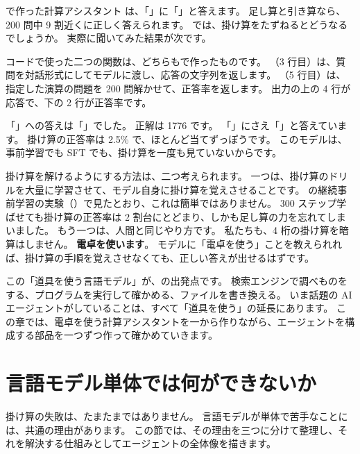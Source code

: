 で作った計算アシスタント  は、「」に「」と答えます。
足し算と引き算なら、200 問中 9 割近くに正しく答えられます。
では、掛け算をたずねるとどうなるでしょうか。
実際に聞いてみた結果が次です。



コードで使った二つの関数は、どちらもで作ったものです。
（3 行目）は、質問を対話形式にしてモデルに渡し、応答の文字列を返します。
（5 行目）は、指定した演算の問題を 200 問解かせて、正答率を返します。
出力の上の 4 行が応答で、下の 2 行が正答率です。

「」への答えは「」でした。
正解は 1776 です。
「」にさえ「」と答えています。
掛け算の正答率は 2.5\% で、ほとんど当てずっぽうです。
このモデルは、事前学習でも SFT でも、掛け算を一度も見ていないからです。

掛け算を解けるようにする方法は、二つ考えられます。
一つは、掛け算のドリルを大量に学習させて、モデル自身に掛け算を覚えさせることです。
の継続事前学習の実験（）で見たとおり、これは簡単ではありません。
300 ステップ学ばせても掛け算の正答率は 2 割台にとどまり、しかも足し算の力を忘れてしまいました。
もう一つは、人間と同じやり方です。
私たちも、4 桁の掛け算を暗算はしません。
\textbf{電卓を使います}。
モデルに「電卓を使う」ことを教えられれば、掛け算の手順を覚えさせなくても、正しい答えが出せるはずです。

この「道具を使う言語モデル」が、の出発点です。
検索エンジンで調べものをする、プログラムを実行して確かめる、ファイルを書き換える。
いま話題の AI エージェントがしていることは、すべて「道具を使う」の延長にあります。
この章では、電卓を使う計算アシスタントを一から作りながら、エージェントを構成する部品を一つずつ作って確かめていきます。

\section{言語モデル単体では何ができないか}\label{sec:agent-why}

掛け算の失敗は、たまたまではありません。
言語モデルが単体で苦手なことには、共通の理由があります。
この節では、その理由を三つに分けて整理し、それを解決する仕組みとしてエージェントの全体像を描きます。

